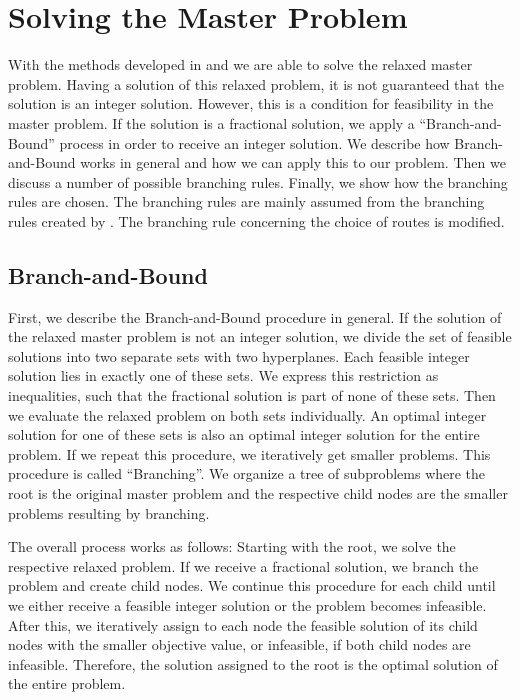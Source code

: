 \section{Solving the Master Problem}
\label{sec:solving_masterproblem}

With the methods developed in  and  we are able to solve the relaxed master problem. Having a solution of this relaxed problem, it is not guaranteed that the solution is an integer solution. However, this is a condition for feasibility in the master problem. If the solution is a fractional solution, we apply a \enquote{Branch-and-Bound} process in order to receive an integer solution. We describe how Branch-and-Bound works in general and how we can apply this to our problem. Then we discuss a number of possible branching rules. Finally, we show how the branching rules are chosen. The branching rules are mainly assumed from the branching rules created by \cite[Sec.~8.2]{Kaiser}. The branching rule concerning the choice of routes is modified.

\subsection{Branch-and-Bound}

First, we describe the Branch-and-Bound procedure in general. If the solution of the relaxed master problem is not an integer solution, we divide the set of feasible solutions into two separate sets with two hyperplanes. Each feasible integer solution lies in exactly one of these sets. We express this restriction as inequalities, such that the fractional solution is part of none of these sets. Then we evaluate the relaxed problem on both sets individually. An optimal integer solution for one of these sets is also an optimal integer solution for the entire problem. If we repeat this procedure, we iteratively get smaller problems. This procedure is called \enquote{Branching}. We organize a tree of subproblems where the root is the original master problem and the respective child nodes are the smaller problems resulting by branching.

The overall process works as follows: Starting with the root, we solve the respective relaxed problem. If we receive a fractional solution, we branch the problem and create child nodes. We continue this procedure for each child until we either receive a feasible integer solution or the problem becomes infeasible. After this, we iteratively assign to each node the feasible solution of its child nodes with the smaller objective value, or infeasible, if both child nodes are infeasible. Therefore, the solution assigned to the root is the optimal solution of the entire problem.

